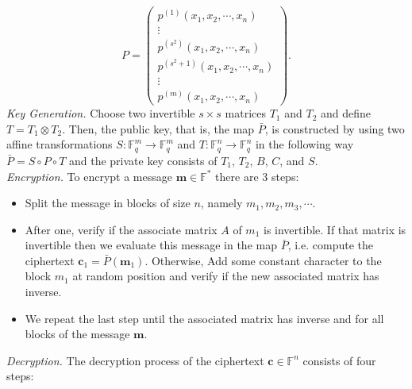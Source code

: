\begin{equation}
 P=\left(\begin{matrix}
    p^{(1)}(x_1,x_2,\cdots,x_n)  \\
    \vdots \\
    p^{(s^2)}(x_1,x_2,\cdots,x_n) \\
    p^{(s^2+1)}(x_1,x_2,\cdots,x_n) \\    
    \vdots \\
    p^{(m)} (x_1,x_2,\cdots,x_n) 
   \end{matrix}\right).
\label{eq:abc}
\end{equation}
\noindent
\textit{Key Generation.} Choose two invertible $s\times s$ matrices $T_1$ and $T_2$ and define $T=T_1 \otimes T_2$. Then, the public key, that is, the map $\bar{P}$, is constructed by using two affine transformations  $S\colon\mathbb{F}_q^{m}\rightarrow \mathbb{F}_q^{m}$ and $T\colon\mathbb{F}_q^{n}\rightarrow \mathbb{F}_q^{n}$ in the following way $\bar{P} = S \circ P \circ T$ and the private key consists of $T_1$, $T_2$, $B$, $C$, and $S$.\\
\noindent
\textit{Encryption.} To encrypt a message $\boldsymbol m \in \mathbb{F}^*$ there are 3 steps:
\begin{itemize} 
\item Split the message in blocks of size $n$, namely $m_1, m_2, m_3, \cdots$. 
\item After one, verify if the associate matrix $A$ of $m_1$ is invertible. If that matrix is invertible then we evaluate this message in the map $\bar{P}$, i.e. compute the ciphertext $\boldsymbol c_1 = \bar{P}(\boldsymbol m_1)$. Otherwise, Add some constant character to the block $m_1$ at random position and verify if the new associated matrix has inverse. 
\item We repeat the last step until the associated matrix has inverse and for all blocks of the message $\boldsymbol m$.\\
\end{itemize}
\noindent
\textit{Decryption.} The decryption process of the ciphertext $\boldsymbol c \in \mathbb{F}^n$ consists of four steps:
